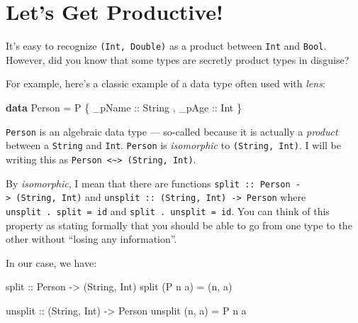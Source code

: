\documentclass[]{article}
\newenvironment{Shaded}{}{}
\newcommand{\DataTypeTok}[1]{\textcolor[rgb]{0.56,0.13,0.00}{#1}}
\newcommand{\FunctionTok}[1]{\textcolor[rgb]{0.02,0.16,0.49}{#1}}
\newcommand{\KeywordTok}[1]{\textcolor[rgb]{0.00,0.44,0.13}{\textbf{#1}}}
\newcommand{\NormalTok}[1]{#1}
\newcommand{\OtherTok}[1]{\textcolor[rgb]{0.00,0.44,0.13}{#1}}
\begin{document}
\hypertarget{lets-get-productive}{%
\section{Let's Get Productive!}\label{lets-get-productive}}

It's easy to recognize \texttt{(Int,\ Double)} as a product between \texttt{Int}
and \texttt{Bool}. However, did you know that some types are secretly product
types in disguise?

For example, here's a classic example of a data type often used with
\emph{lens}:

\begin{Shaded}
\begin{Highlighting}[]
\KeywordTok{data} \DataTypeTok{Person} \FunctionTok{=} \DataTypeTok{P}\NormalTok{ \{}\OtherTok{ _pName ::} \DataTypeTok{String}
\NormalTok{                ,}\OtherTok{ _pAge  ::} \DataTypeTok{Int}
\NormalTok{                \}}
\end{Highlighting}
\end{Shaded}

\texttt{Person} is an algebraic data type --- so-called because it is actually a
\emph{product} between a \texttt{String} and \texttt{Int}. \texttt{Person} is
\emph{isomorphic} to \texttt{(String,\ Int)}. I will be writing this as
\texttt{Person\ \textless{}\textasciitilde{}\textgreater{}\ (String,\ Int)}.

By \emph{isomorphic}, I mean that there are functions
\texttt{split\ ::\ Person\ -\textgreater{}\ (String,\ Int)} and
\texttt{unsplit\ ::\ (String,\ Int)\ -\textgreater{}\ Person} where
\texttt{unsplit\ .\ split\ =\ id} and \texttt{split\ .\ unsplit\ =\ id}. You can
think of this property as stating formally that you should be able to go from
one type to the other without ``losing any information''.

In our case, we have:

\begin{Shaded}
\begin{Highlighting}[]
\OtherTok{split ::} \DataTypeTok{Person} \OtherTok{->}\NormalTok{ (}\DataTypeTok{String}\NormalTok{, }\DataTypeTok{Int}\NormalTok{)}
\NormalTok{split (}\DataTypeTok{P}\NormalTok{ n a) }\FunctionTok{=}\NormalTok{ (n, a)}

\OtherTok{unsplit ::}\NormalTok{ (}\DataTypeTok{String}\NormalTok{, }\DataTypeTok{Int}\NormalTok{) }\OtherTok{->} \DataTypeTok{Person}
\NormalTok{unsplit (n, a) }\FunctionTok{=} \DataTypeTok{P}\NormalTok{ n a}
\end{Highlighting}
\end{Shaded}
\end{document}

